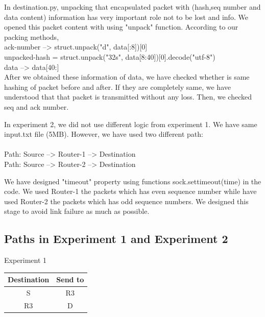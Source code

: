 \documentclass[letterpaper, 12 pt, conference]{ieeeconf}  %
\begin{document}
In destination.py, unpacking that encapsulated packet with (hash,seq number and data content) information has very important role not to be lost and info. We opened this packet content with using "unpack" function. According to our packing methods,\\
ack-number --> struct.unpack("d", data[:8])[0]\\
unpacked-hash = struct.unpack("32s", data[8:40])[0].decode("utf-8")\\
data --> data[40:]\\
After we obtained these information of data, we have checked whether is same hashing of packet before and after. If they are completely same, we have understood that that packet is transmitted without any loss. Then, we checked seq and ack number.
\vspace{1cm}

In experiment 2, we did not use different logic from experiment 1. We have same input.txt file (5MB). However, we have used two different path:\\\\
Path: Source -->   Router-1   --> Destination \\
Path: Source -->   Router-2   --> Destination \\
\vspace{1cm}

We have designed "timeout" property using functions sock.settimeout(time) in the code. We used Router-1 the packets which has even sequence number while have used Router-2 the packets which has odd sequence numbers. We designed this stage to avoid link failure as much as possible.

\subsection{ Paths in Experiment 1 and Experiment 2 }
\begin{center}
Experiment 1
\end{center}

\begin{center}
 \begin{tabular}{||c c||} 
 \hline
 Destination & Send to  \\ [0.25ex] 
 \hline\hline
 S & R3  \\ 
 \hline
 R3 & D  \\

 
 \hline
\end{tabular}
\end{center}
\end{document}
